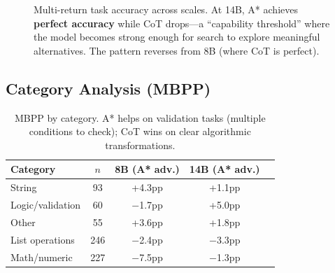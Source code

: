 \begin{figure}[htbp]
\centering
{}
\caption{Multi-return task accuracy across scales. At 14B, A* achieves \textbf{perfect accuracy} while CoT drops---a ``capability threshold'' where the model becomes strong enough for search to explore meaningful alternatives. The pattern reverses from 8B (where CoT is perfect).}
\label{fig:multi_return_scaling}
\end{figure}

\subsection{Category Analysis (MBPP)}

\begin{table}[ht]
\centering
\small
\begin{tabular}{lcccc}
\toprule
\textbf{Category} & \textbf{$n$} & \textbf{8B (A* adv.)} & \textbf{14B (A* adv.)} \\
\midrule
String & 93 & +4.3pp & +1.1pp \\
Logic/validation & 60 & $-$1.7pp & +5.0pp \\
Other & 55 & +3.6pp & +1.8pp \\
List operations & 246 & $-$2.4pp & $-$3.3pp \\
Math/numeric & 227 & $-$7.5pp & $-$1.3pp \\
\bottomrule
\end{tabular}
\caption{MBPP by category. A* helps on validation tasks (multiple conditions to check); CoT wins on clear algorithmic transformations.}
\label{tab:categories_thesis}
\end{table}

